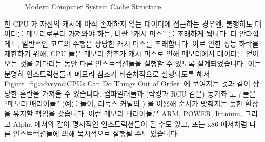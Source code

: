 \begin{figure}[htb]
\begin{center}
\end{center}
\caption{Modern Computer System Cache Structure}
\label{fig:advsync:Modern Computer System Cache Structure}
\end{figure}

한 CPU 가 자신의 캐시에 아직 존재하지 않는 데이터에 접근하는 경우엔, 불행히도
데이터를 메모리로부터 가져와야 하는, 비싼 ``캐시 미스'' 를 초래하게 됩니다.
더 안타깝게도, 일반적인 코드의 수행은 상당한 캐시 미스를 초래합니다.
이로 인한 성능 하락을 제한하기 위해, CPU 들은 메모리 참조가 캐시 미스로 인해
메모리에서 데이터를 얻어오는 것을 기다리는 동안 다른 인스트럭션들을 실행할 수
있도록 설계되었습니다.
이는 분명히 인스트럭션들과 메모리 참조가 비순차적으로 실행되도록 해서
Figure~\ref{fig:advsync:CPUs Can Do Things Out of Order} 에 보여지는 것과 같이
상당한 혼란을 가져올 수 있습니다.
컴파일러들과 (락킹과 RCU 같은) 동기화 도구들은 ``메모리 배리어들'' (예를 들어,
리눅스 커널의 ) 을 이용해 순서가 맞춰지는 듯한 환상을 유지할
책임을 갖습니다.
이런 메모리 배리어들은 ARM, POWER, Itanium, 그리고 Alpha 에서와 같이 명시적인
인스트럭션들이 될 수도 있고, 또는 x86 에서처럼 다른 인스트럭션들에 의해
묵시적으로 실행될 수도 있습니다.

